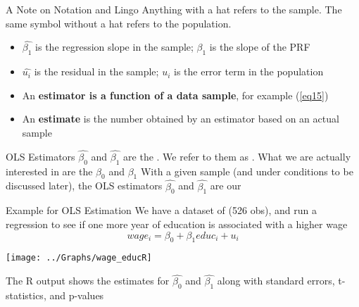 \begin{frame}{A Note on Notation and Lingo}
Anything with a hat refers to the sample. The same symbol without a hat refers to the population.
\begin{itemize}
\item $\widehat{\beta_1}$ is the regression slope in the sample; $\beta_1$ is the slope of the PRF
\item $\widehat{u_i}$ is the residual in the sample; $u_i$ is the error term in the population
\end{itemize}
\vfill
\pause
{}
\begin{itemize}
\item An \textbf{estimator is a function of a data sample}, for example (\ref{eq15})
\item An \textbf{estimate} is the number obtained by an estimator based on an actual sample
\end{itemize}
\end{frame}

\begin{frame}{OLS Estimators}
$\widehat{\beta_0}$ and $\widehat{\beta_1}$ are the . We refer to them as . 
\vfill
What we are actually interested in are the  $\beta_0$ and $\beta_1$
\vfill
With a given sample (and under conditions to be discussed later), the OLS estimators $\widehat{\beta_0}$ and $\widehat{\beta_1}$ are our
\end{frame}

\begin{frame}{Example for OLS Estimation}
We have a dataset of  (526 obs), and run a regression to see if one more year of education is associated with a higher wage
\begin{equation*}
wage_i=\beta_0+ \beta_1 educ_i + u_i
\end{equation*}
\vfill
\begin{center}
\texttt{[image: ../Graphs/wage\_educR]}
\end{center}
The R output shows the estimates for $\widehat{\beta_0}$ and $\widehat{\beta_1}$ along with standard errors, t-statistics, and p-values
\end{frame}


